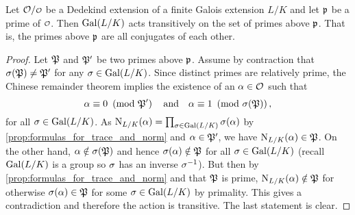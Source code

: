     \begin{proposition}\label{prop:Galois_action_on_primes_is_transitive}
      Let $\mc{O}/\smc{O}$ be a Dedekind extension of a finite Galois extension $L/K$ and let $\mathfrak{p}$ be a prime of $\smc{O}$. Then $\operatorname{\mathrm{Gal}}(L/K)$ acts transitively on the set of primes above $\mathfrak{p}$. That is, the primes above $\mathfrak{p}$ are all conjugates of each other.
    \end{proposition}
    \begin{proof}
      Let $\mathfrak{P}$ and $\mathfrak{P}'$ be two primes above $\mathfrak{p}$. Assume by contraction that $\sigma(\mathfrak{P}) \neq \mathfrak{P}'$ for any $\sigma \in \operatorname{\mathrm{Gal}}(L/K)$. Since distinct primes are relatively prime, the Chinese remainder theorem implies the existence of an $\alpha \in \mathcal{O}$ such that
      \[
        \alpha \equiv 0 \ \left(\text{mod }\mathfrak{P}'\right) \quad \text{and} \quad \alpha \equiv 1 \ \left(\text{mod }\sigma(\mathfrak{P})\right),
      \]
      for all $\sigma \in \operatorname{\mathrm{Gal}}(L/K)$. As $\operatorname{\mathrm{N}}_{L/K}(\alpha) = \prod_{\sigma \in \operatorname{\mathrm{Gal}}(L/K)}\sigma(\alpha)$ by \cref{prop:formulas_for_trace_and_norm} and $\alpha \in \mathfrak{P}'$, we have $\operatorname{\mathrm{N}}_{L/K}(\alpha) \in \mathfrak{P}$. On the other hand, $\alpha \notin \sigma(\mathfrak{P})$ and hence $\sigma(\alpha) \notin \mathfrak{P}$ for all $\sigma \in \operatorname{\mathrm{Gal}}(L/K)$ (recall $\operatorname{\mathrm{Gal}}(L/K)$ is a group so $\sigma$ has an inverse $\sigma^{-1}$). But then by \cref{prop:formulas_for_trace_and_norm} and that $\mathfrak{P}$ is prime, $\operatorname{\mathrm{N}}_{L/K}(\alpha) \notin \mathfrak{P}$ for otherwise $\sigma(\alpha) \in \mathfrak{P}$ for some $\sigma \in \operatorname{\mathrm{Gal}}(L/K)$ by primality. This gives a contradiction and therefore the action is transitive. The last statement is clear.
    \end{proof}


